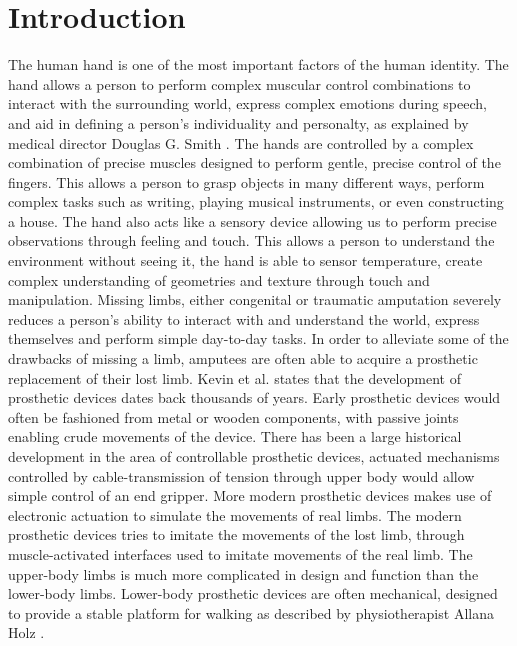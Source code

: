 \documentclass[../main.tex]{subfiles}
\begin{document}
\section{Introduction}

The human hand is one of the most important factors of the human identity.
The hand allows a person to perform complex muscular control combinations to interact with the surrounding world, express complex emotions during speech, and aid in defining a person's individuality and personalty, as explained by medical director Douglas G. Smith \cite{Douglashands}.
The hands are controlled by a complex combination of precise muscles designed to perform gentle, precise control of the fingers.
This allows a person to grasp objects in many different ways, perform complex tasks such as writing, playing musical instruments, or even constructing a house.
The hand also acts like a sensory device allowing us to perform precise observations through feeling and touch.
This allows a person to understand the environment without seeing it, the hand is able to sensor temperature, create complex understanding of geometries and texture through touch and manipulation.
Missing limbs, either \gls{congenital} or \gls{traumatic} amputation severely reduces a person's ability to interact with and understand the world, express themselves and perform simple day-to-day tasks.
In order to alleviate some of the drawbacks of missing a limb, amputees are often able to acquire a prosthetic replacement of their lost limb.
Kevin et al. \cite{Kevin2014} states that the development of prosthetic devices dates back thousands of years.
Early prosthetic devices would often be fashioned from metal or wooden components, with passive joints enabling crude movements of the device. 
There has been a large historical development in the area of controllable prosthetic devices, actuated mechanisms controlled by cable-transmission of tension through upper body would allow simple control of an end gripper.
More modern prosthetic devices makes use of electronic actuation to simulate the movements of real limbs.
The modern prosthetic devices tries to imitate the movements of the lost limb, through muscle-activated interfaces used to imitate movements of the real limb. 
The upper-body limbs is much more complicated in design and function than the lower-body limbs.
Lower-body prosthetic devices are often mechanical, designed to provide a stable platform for walking as described by physiotherapist Allana Holz \cite{mechanicallegs}.
\end{document}

